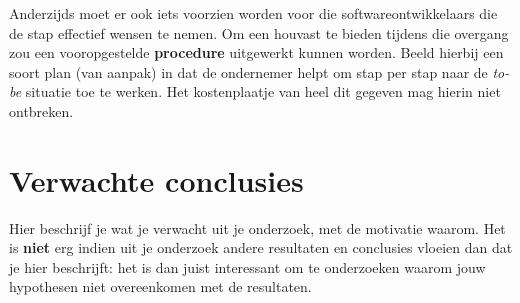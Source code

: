 Anderzijds moet er ook iets voorzien worden voor die softwareontwikkelaars die de stap effectief wensen te nemen. Om een houvast te bieden tijdens die overgang zou een vooropgestelde \textbf{procedure} uitgewerkt kunnen worden. Beeld hierbij een soort plan (van aanpak) in dat de ondernemer helpt om stap per stap naar de \textit{to-be} situatie toe te werken. Het kostenplaatje van heel dit gegeven mag hierin niet ontbreken.


\section{Verwachte conclusies}
\label{sec:verwachte_conclusies}

Hier beschrijf je wat je verwacht uit je onderzoek, met de motivatie waarom. Het is \textbf{niet} erg indien uit je onderzoek andere resultaten en conclusies vloeien dan dat je hier beschrijft: het is dan juist interessant om te onderzoeken waarom jouw hypothesen niet overeenkomen met de resultaten.

